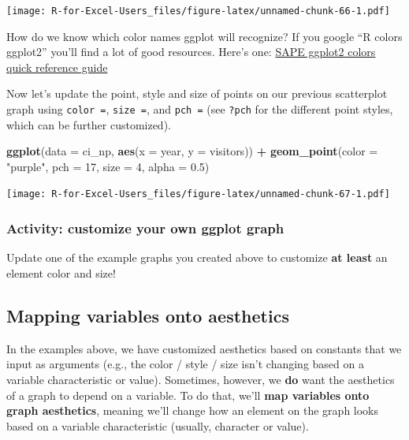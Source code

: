 \documentclass[]{book}
\newenvironment{Shaded}{\begin{snugshade}}{\end{snugshade}}
\newcommand{\DataTypeTok}[1]{\textcolor[rgb]{0.13,0.29,0.53}{#1}}
\newcommand{\DecValTok}[1]{\textcolor[rgb]{0.00,0.00,0.81}{#1}}
\newcommand{\FloatTok}[1]{\textcolor[rgb]{0.00,0.00,0.81}{#1}}
\newcommand{\KeywordTok}[1]{\textcolor[rgb]{0.13,0.29,0.53}{\textbf{#1}}}
\newcommand{\NormalTok}[1]{#1}
\newcommand{\OperatorTok}[1]{\textcolor[rgb]{0.81,0.36,0.00}{\textbf{#1}}}
\newcommand{\StringTok}[1]{\textcolor[rgb]{0.31,0.60,0.02}{#1}}
\begin{document}
\texttt{[image: R-for-Excel-Users\_files/figure-latex/unnamed-chunk-66-1.pdf]}

How do we know which color names ggplot will recognize? If you google ``R colors ggplot2'' you'll find a lot of good resources. Here's one: \href{http://sape.inf.usi.ch/quick-reference/ggplot2/colour}{SAPE ggplot2 colors quick reference guide}

Now let's update the point, style and size of points on our previous scatterplot graph using \texttt{color\ =}, \texttt{size\ =}, and \texttt{pch\ =} (see \texttt{?pch} for the different point styles, which can be further customized).

\begin{Shaded}
\begin{Highlighting}[]
\KeywordTok{ggplot}\NormalTok{(}\DataTypeTok{data =}\NormalTok{ ci_np, }\KeywordTok{aes}\NormalTok{(}\DataTypeTok{x =}\NormalTok{ year, }\DataTypeTok{y =}\NormalTok{ visitors)) }\OperatorTok{+}
\StringTok{  }\KeywordTok{geom_point}\NormalTok{(}\DataTypeTok{color =} \StringTok{"purple"}\NormalTok{,}
             \DataTypeTok{pch =} \DecValTok{17}\NormalTok{,}
             \DataTypeTok{size =} \DecValTok{4}\NormalTok{,}
             \DataTypeTok{alpha =} \FloatTok{0.5}\NormalTok{)}
\end{Highlighting}
\end{Shaded}

\texttt{[image: R-for-Excel-Users\_files/figure-latex/unnamed-chunk-67-1.pdf]}

\hypertarget{activity-customize-your-own-ggplot-graph}{%
\subsubsection{Activity: customize your own ggplot graph}\label{activity-customize-your-own-ggplot-graph}}

Update one of the example graphs you created above to customize \textbf{at least} an element color and size!

\hypertarget{mapping-variables-onto-aesthetics}{%
\subsection{Mapping variables onto aesthetics}\label{mapping-variables-onto-aesthetics}}

In the examples above, we have customized aesthetics based on constants that we input as arguments (e.g., the color / style / size isn't changing based on a variable characteristic or value). Sometimes, however, we \textbf{do} want the aesthetics of a graph to depend on a variable. To do that, we'll \textbf{map variables onto graph aesthetics}, meaning we'll change how an element on the graph looks based on a variable characteristic (usually, character or value).
\end{document}
